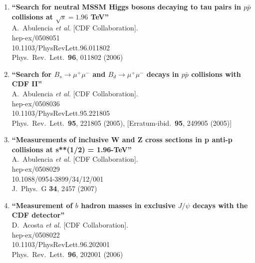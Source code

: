 \documentclass{article}
\begin{document}
\begin{enumerate}
\item%
{\bf ``Search for neutral MSSM Higgs bosons decaying to tau pairs in $p\bar{p}$ collisions at $\sqrt{s} = 1.96$ TeV''}
  \\{}A.~Abulencia {\it et al.}  [CDF Collaboration].
  \\{}hep-ex/0508051
    \\{}10.1103/PhysRevLett.96.011802
\\{}Phys.\ Rev.\ Lett.\  {\bf 96}, 011802 (2006) %


\item%
{\bf ``Search for $B_s \to \mu^+ \mu^-$ and $B_d \to \mu^+ \mu^-$ decays in $p\bar{p}$ collisions with CDF II''}
  \\{}A.~Abulencia {\it et al.}  [CDF Collaboration].
  \\{}hep-ex/0508036
    \\{}10.1103/PhysRevLett.95.221805
\\{}Phys.\ Rev.\ Lett.\  {\bf 95}, 221805 (2005), [Erratum-ibid.\  {\bf 95}, 249905 (2005)] %


\item%
{\bf ``Measurements of inclusive W and Z cross sections in p anti-p collisions at s**(1/2) = 1.96-TeV''}
  \\{}A.~Abulencia {\it et al.}  [CDF Collaboration].
  \\{}hep-ex/0508029
    \\{}10.1088/0954-3899/34/12/001
\\{}J.\ Phys.\ G {\bf 34}, 2457 (2007) %


\item%
{\bf ``Measurement of $b$ hadron masses in exclusive $J/\psi$ decays with the CDF detector''}
  \\{}D.~Acosta {\it et al.}  [CDF Collaboration].
  \\{}hep-ex/0508022
    \\{}10.1103/PhysRevLett.96.202001
\\{}Phys.\ Rev.\ Lett.\  {\bf 96}, 202001 (2006) %



\end{enumerate}
\end{document}
